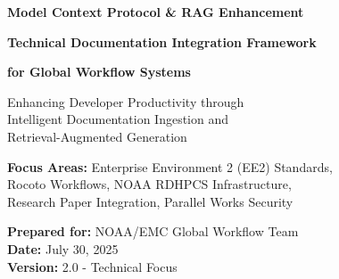 \documentclass[11pt,letterpaper]{article}
\begin{document}
\begin{titlepage}
\pagecolor{white}


\vspace{4cm}
\begin{center}
\color{noaaNavy}
\fontsize{32}{38}\selectfont\textbf{Model Context Protocol \& RAG Enhancement}

\vspace{0.8cm}
\fontsize{24}{28}\selectfont\textbf{Technical Documentation Integration Framework}

\vspace{0.5cm}
\fontsize{20}{24}\selectfont\textbf{for Global Workflow Systems}

\vspace{2cm}
\color{black}
\fontsize{18}{22}\selectfont
Enhancing Developer Productivity through \\
Intelligent Documentation Ingestion and \\
Retrieval-Augmented Generation

\vspace{1.5cm}
\fontsize{16}{20}\selectfont
\textbf{Focus Areas:} Enterprise Environment 2 (EE2) Standards, \\
Rocoto Workflows, NOAA RDHPCS Infrastructure, \\
Research Paper Integration, Parallel Works Security

\vspace{1.5cm}
\fontsize{14}{18}\selectfont
\textbf{Prepared for:} NOAA/EMC Global Workflow Team \\
\textbf{Date:} July 30, 2025 \\
\textbf{Version:} 2.0 - Technical Focus

\vspace{1cm}
\end{center}
\end{titlepage}

\newpage

\end{document}
